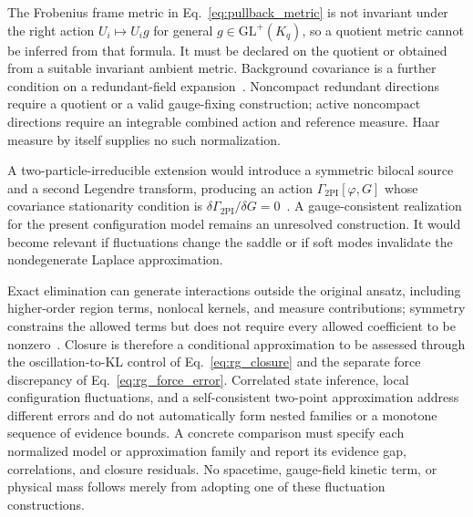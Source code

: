 The Frobenius frame metric in Eq.~\eqref{eq:pullback_metric} is not invariant under the right action $U_i\mapsto U_i g$ for general $g\in\mathrm{GL}^+(K_q)$, so a quotient metric cannot be inferred from that formula. It must be declared on the quotient or obtained from a suitable invariant ambient metric. Background covariance is a further condition on a redundant-field expansion~\cite{DeWitt1967,Abbott1981,Abbott1982}. Noncompact redundant directions require a quotient or a valid gauge-fixing construction; active noncompact directions require an integrable combined action and reference measure. Haar measure by itself supplies no such normalization.

A two-particle-irreducible extension would introduce a symmetric bilocal source and a second Legendre transform, producing an action $\Gamma_{\mathrm{2PI}}[\varphi,G]$ whose covariance stationarity condition is $\delta\Gamma_{\mathrm{2PI}}/\delta G=0$~\cite{CornwallJackiwTomboulis1974}. A gauge-consistent realization for the present configuration model remains an unresolved construction. It would become relevant if fluctuations change the saddle or if soft modes invalidate the nondegenerate Laplace approximation.

Exact elimination can generate interactions outside the original ansatz, including higher-order region terms, nonlocal kernels, and measure contributions; symmetry constrains the allowed terms but does not require every allowed coefficient to be nonzero~\cite{Wilson1974}. Closure is therefore a conditional approximation to be assessed through the oscillation-to-KL control of Eq.~\eqref{eq:rg_closure} and the separate force discrepancy of Eq.~\eqref{eq:rg_force_error}. Correlated state inference, local configuration fluctuations, and a self-consistent two-point approximation address different errors and do not automatically form nested families or a monotone sequence of evidence bounds. A concrete comparison must specify each normalized model or approximation family and report its evidence gap, correlations, and closure residuals. No spacetime, gauge-field kinetic term, or physical mass follows merely from adopting one of these fluctuation constructions.
